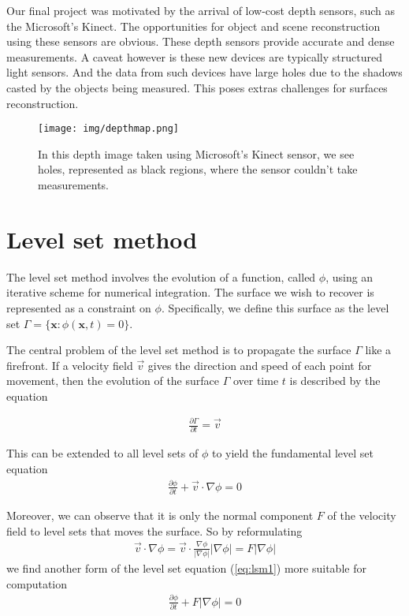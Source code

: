 \documentclass{article}
\begin{document}
Our final project was motivated by the arrival of low-cost depth sensors, such
as the Microsoft's Kinect. The opportunities for object and scene
reconstruction using these sensors are obvious. These depth sensors provide
accurate and dense measurements. A caveat however is these new devices are
typically structured light sensors. And the data from such devices have large
holes due to the shadows casted by the objects being measured. This poses
extras challenges for surfaces reconstruction.

\begin{figure}
  \centering
  \texttt{[image: img/depthmap.png]}
  \caption{In this depth image taken using Microsoft's Kinect sensor, we see
holes, represented as black regions, where the sensor couldn't take
measurements.}

\end{figure}

\section{Level set method}
\label{sec:lsm}
The level set method involves the evolution of a function, called $\phi$,
using an iterative scheme for numerical integration. The surface we wish to
recover is represented as a constraint on $\phi$. Specifically, we define this
surface as the level set $\Gamma=\{\mathbf{x}:\phi(\mathbf{x}, t)=0\}$.

The central problem of the level set method is to propagate the surface
$\Gamma$ like a firefront. If a velocity field $\vec{v}$ gives the direction
and speed of each point for movement, then the evolution of the surface
$\Gamma$ over time $t$ is described by the equation

\begin{align}
  \frac{\partial \Gamma}{\partial t} = \vec{v}
\end{align}

This can be extended to all level sets of $\phi$ to yield the fundamental
level set equation
\begin{align}
  \frac{\partial \phi}{\partial t} + \vec{v} \cdot \nabla \phi = 0
  \label{eq:lsm1}
\end{align}

Moreover, we can observe that it is only the normal component $F$ of the
velocity field to level sets that moves the surface. So by reformulating
\begin{align}
  \vec{v} \cdot \nabla \phi
  = \vec{v} \cdot \frac{\nabla \phi}{|\nabla \phi|}|\nabla \phi| 
  = F|\nabla \phi|
\end{align}
we find another form of the level set equation (\ref{eq:lsm1}) more suitable
for computation
\begin{align}
  \frac{\partial \phi}{\partial t} + F|\nabla \phi| = 0
\end{align}
\end{document}
